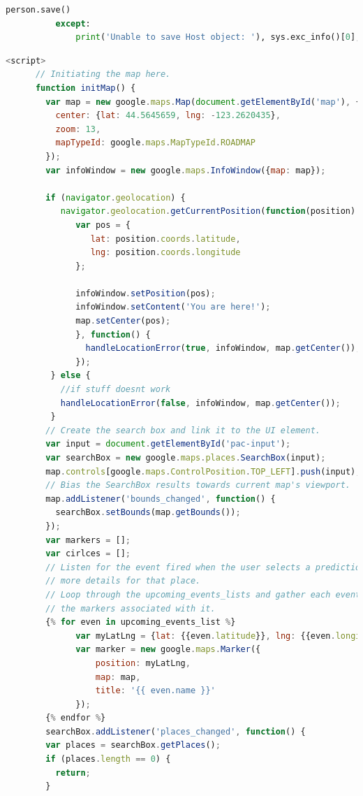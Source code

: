 \documentclass[draftclsnofoot,10pt,onecolumn]{IEEEtran} %
\begin{document}
\begin{center}
\begin{lstlisting}[caption=Views.py showing the importing of hosts of the 
                      events, language=Python]
              person.save()
          except:
              print('Unable to save Host object: '), sys.exc_info()[0], sys.exc_info()[1]
  \end{lstlisting}
\end{center}

\begin{center}
  \captionsetup{width=.5\linewidth}
  \begin{lstlisting}[caption=eventSearch.html showing JavaScript that creates
  the map for the events search, language=JavaScript]
    <script>
      // Initiating the map here.
      function initMap() {
        var map = new google.maps.Map(document.getElementById('map'), {
          center: {lat: 44.5645659, lng: -123.2620435},
          zoom: 13,
          mapTypeId: google.maps.MapTypeId.ROADMAP
        });
        var infoWindow = new google.maps.InfoWindow({map: map});
       
        if (navigator.geolocation) {
           navigator.geolocation.getCurrentPosition(function(position) {
              var pos = {
                 lat: position.coords.latitude,
                 lng: position.coords.longitude
              };
              
              infoWindow.setPosition(pos);
              infoWindow.setContent('You are here!');
              map.setCenter(pos);
              }, function() {
                handleLocationError(true, infoWindow, map.getCenter());
              });
         } else {
           //if stuff doesnt work
           handleLocationError(false, infoWindow, map.getCenter());
         }
        // Create the search box and link it to the UI element.
        var input = document.getElementById('pac-input');
        var searchBox = new google.maps.places.SearchBox(input);
        map.controls[google.maps.ControlPosition.TOP_LEFT].push(input);
        // Bias the SearchBox results towards current map's viewport.
        map.addListener('bounds_changed', function() {
          searchBox.setBounds(map.getBounds());
        });
        var markers = [];
        var cirlces = [];
        // Listen for the event fired when the user selects a prediction and retrieve
        // more details for that place.
        // Loop through the upcoming_events_lists and gather each events lat and lon to create
        // the markers associated with it.
        {% for even in upcoming_events_list %}
              var myLatLng = {lat: {{even.latitude}}, lng: {{even.longitude}}};
              var marker = new google.maps.Marker({
                  position: myLatLng,
                  map: map,
                  title: '{{ even.name }}'
              });
        {% endfor %}
        searchBox.addListener('places_changed', function() {
        var places = searchBox.getPlaces();
        if (places.length == 0) {
          return;
        }
        

\end{lstlisting}
\end{center}
\end{document}

